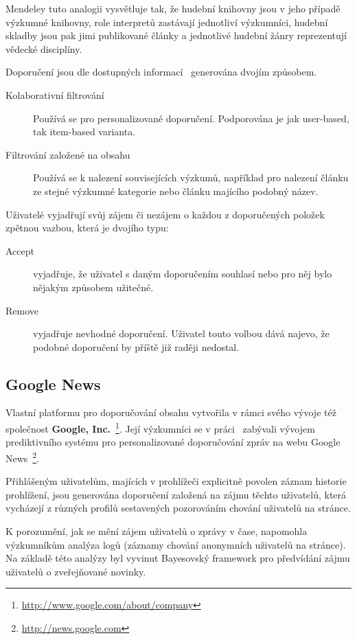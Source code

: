 \documentclass[thesis=M,czech]{FITthesis}[2014/05/07]
\begin{document}
Mendeley tuto analogii vysvětluje tak, že hudební knihovny jsou v jeho případě výzkumné knihovny, role interpretů zastávají jednotliví výzkumníci, hudební skladby jsou pak jimi publikované články a jednotlivé hudební žánry reprezentují vědecké disciplíny.  

Doporučení jsou dle dostupných informací~\cite{mendeleylastfm} generována dvojím způsobem. 

\begin{description}
	\item[Kolaborativní filtrování] Používá se pro personalizované doporučení. Podporována je jak user-based, tak item-based varianta.
	\item[Filtrování založené na obsahu] Používá se k nalezení souvisejících výzkumů, například pro nalezení článku ze stejné výzkumné kategorie nebo článku majícího podobný název. 
\end{description}

Uživatelé vyjadřují svůj zájem či nezájem o každou z doporučených položek zpětnou vazbou, která je dvojího typu:

\begin{description}
	\item[Accept] vyjadřuje, že uživatel s daným doporučením souhlasí nebo pro něj bylo nějakým způsobem užitečné.
	\item[Remove] vyjadřuje nevhodné doporučení. Uživatel touto volbou dává najevo, že podobné doporučení by příště již raději nedostal.
\end{description}

\subsection{Google News}	

Vlastní platformu pro doporučování obsahu vytvořila v rámci svého vývoje též společnost \textbf{Google, Inc.}~\footnote{\url{http://www.google.com/about/company}}. Její výzkumníci se v práci~\cite{googlenews} zabývali vývojem prediktivního systému pro personalizované doporučování zpráv na webu Google News~\footnote{\url{http://news.google.com}}.

Přihlášeným uživatelům, majících v prohlížeči explicitně povolen záznam historie prohlížení, jsou generována doporučení založená na zájmu těchto uživatelů, která vycházejí z různých profilů sestavených pozorováním chování uživatelů na stránce.  

K porozumění, jak se mění zájem uživatelů o zprávy v čase, napomohla výzkumníkům analýza logů (záznamy chování anonymních uživatelů na stránce). Na základě této analýzy byl vyvinut Bayesovský framework pro předvídání zájmu uživatelů o zveřejňované novinky.
\end{document}
